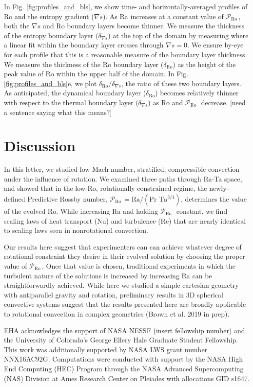 \documentclass[twocolumn, amsmath, amsfonts, amssymb]{aastex62}
\newcommand{\grad}{\ensuremath{\nabla}}
\newcommand{\pro}{\ensuremath{\mathcal{P}_{\text{Ro}}\,}}
\begin{document}
In Fig. \ref{fig:profiles_and_bls}, we show time- and horizontally-averaged profiles of
Ro and the entropy gradient ($\grad s$). As Ra increases at a constant value of
\pro, both the $\grad s$ and Ro boundary layers become thinner. We measure the
thickness of the entropy boundary layer ($\delta_{\grad s}$) at the top of the domain by 
measuring where a linear fit within the boundary layer crosses through $\grad s = 0$.
We ensure by-eye for each profile that this is a reasonable measure of the boundary
layer thickness. We measure
the thickness of the Ro boundary layer ($\delta_{\text{Ro}}$) 
as the height of the peak value of Ro within the
upper half of the domain.
In Fig. \ref{fig:profiles_and_bls}e, we plot $\delta_{\text{Ro}}/\delta_{\grad s}$, the ratio
of these two boundary layers. As anticipated, the dynamical boundary layer ($\delta_{\text{Ro}}$)
becomes relatively thinner with respect to the thermal boundary layer ($\delta_{\grad s}$)
as Ro and \pro$\,$ decrease. [need a sentence saying what this means?]

\section{Discussion}
\label{sec:discussion}
In this letter, we studied low-Mach-number, stratified, compressible convection 
under the influence of rotation.
We examined three paths through Ra-Ta space, and showed that in the low-Ro, rotationally
constrained regime, the newly-defined 
Predictive Rossby number, $\pro = \text{Ra}/(\text{Pr }\text{Ta}^{3/4})$, determines the value of
the evolved Ro. While increasing Ra and holding \pro$\,$ constant,
we find scaling laws of heat transport (Nu) and turbulence (Re) that are nearly identical
to scaling laws seen in nonrotational convection.

Our results here suggest that experimenters can
can achieve whatever degree of rotational constraint they desire in their evolved solution
by choosing the proper value of \pro. Once that value is chosen, traditional experiments
in which the turbulent nature of the solutions is increased by increasing Ra can be 
straightforwardly achieved. While here we studied a simple cartesian geometry with antiparallel
gravity and rotation, preliminary results in 3D spherical convective systems suggest
that the results presented here are broadly applicable to rotational convection in
complex geometries (Brown et al. 2019 in prep).


\begin{acknowledgements}
EHA acknowledges the support of NASA NESSF (insert fellowship number)
and the University of Colorado's George 
Ellery Hale Graduate Student Fellowship.
This work was additionally supported by  NASA LWS grant number NNX16AC92G.  
Computations were conducted 
with support by the NASA High End Computing (HEC) Program through the NASA 
Advanced Supercomputing (NAS) Division at Ames Research Center on Pleiades
with allocations GID s1647.
\end{acknowledgements}

\newpage

\end{document}
